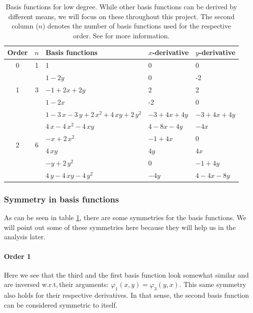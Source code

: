 \documentclass{article}
\renewcommand{\phi}{\varphi}
\begin{document}
\begin{table}[ht]
  \centering
  \begin{tabular}{cclll}
    \toprule
    Order & $n$ & Basis functions & $x$-derivative & $y$-derivative \\
    \midrule
    \multirow{1}{*}{0} & 1 & 1 & 0 & 0\\
    \midrule
    \multirow{3}{*}{1} & \multirow{3}{*}{3} & $1-2y$ & 0 & -2\\
    &  & $-1+2x+2y$ & 2 & 2\\
    &  & $1-2x$ & -2 & 0\\
    \midrule
    \multirow{6}{*}{2} & \multirow{6}{*}{6} & $1-3\,x-3\,y+2\,{x}^{2}+4\,xy+2\,{y}^{2}$ & $-3+4x+4y$ & $-3+4x+4y$\\
& & $4\,x-4\,{x}^{2}-4\,xy$ & $4-8x-4y$ & $-4x$\\
& & $-x+2\,{x}^{2}$ & $-1+4x$ & 0\\
& & $4\,xy$ & $4y$ & $4x$\\
& & $-y+2\,{y}^{2}$ & $0$ & $-1+4y$\\
& & $4\,y-4\,xy-4\,{y}^{2}$ & $-4y$ & $4-4x-8y$ \\
    \bottomrule
  \end{tabular}
  \caption{Basis functions for low degree. While other basis functions can be derived by different means, we will focus on these throughout this project. The second column ($n$) denotes the number of basis functions used for the respective order. See \cite{castro07high-order-ader-fv-dg-numerical-methods,dunavant1985high} for more information.}
  \label{tab:basis-functions-for-low-degrees}
\end{table}

\subsubsection{Symmetry in basis functions}
\label{sec:basis-function-symmetry}

As can be seen in table \ref{tab:basis-functions-for-low-degrees}, there are some symmetries for the basis functions. We will point out some of these symmetries here because they will help us in the analysis later.

\paragraph{Order 1}

Here we see that the third and the first basis function look somewhat similar and are inversed w.r.t,\,their arguments: $\phi_1(x,y)=\phi_3(y,x)$. This same symmetry also holds for their respective derivatives. In that sense, the second basis function can be considered symmetric to itself.
\end{document}
